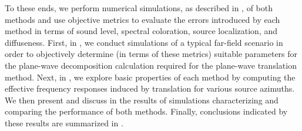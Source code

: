 To these ends, we perform numerical simulations, as described in , of both methods and use objective metrics to evaluate the errors introduced by each method in terms of sound level, spectral coloration, source localization, and diffuseness.
First, in , we conduct simulations of a typical far-field scenario in order to objectively determine (in terms of these metrics) suitable parameters for the plane-wave decomposition calculation required for the plane-wave translation method.
Next, in , we explore basic properties of each method by computing the effective frequency responses induced by translation for various source azimuths.
We then present and discuss in  the results of simulations characterizing and comparing the performance of both methods.
Finally, conclusions indicated by these results are summarized in .